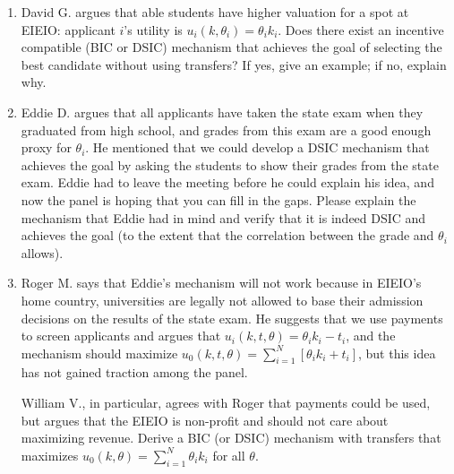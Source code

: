 \documentclass[a4paper]{article}
\newif\ifsolutions
\begin{document}
\begin{enumerate}
	\item David G. argues that able students have higher valuation for a spot at EIEIO: applicant $i$'s utility is $u_i(k,\theta_i) = \theta_i k_i$. Does there exist an incentive compatible (BIC or DSIC) mechanism that achieves the goal of selecting the best candidate without using transfers? If yes, give an example; if no, explain why.
	
	\item Eddie D. argues that all applicants have taken the state exam when they graduated from high school, and grades from this exam are a good enough proxy for $\theta_i$. He mentioned that we could develop a DSIC mechanism that achieves the goal by asking the students to show their grades from the state exam. Eddie had to leave the meeting before he could explain his idea, and now the panel is hoping that you can fill in the gaps. Please explain the mechanism that Eddie had in mind and verify that it is indeed DSIC and achieves the goal (to the extent that the correlation between the grade and $\theta_i$ allows).
	
	\item Roger M. says that Eddie's mechanism will not work because in EIEIO's home country, universities are legally not allowed to base their admission decisions on the results of the state exam. He suggests that we use payments to screen applicants and argues that $u_i(k,t,\theta) = \theta_i k_i - t_i$, and the mechanism should maximize $u_0(k,t,\theta) = \sum_{i=1}^N \left[ \theta_i k_i + t_i \right]$, but this idea has not gained traction among the panel. 
	
	William V., in particular, agrees with Roger that payments could be used, but argues that the EIEIO is non-profit and should not care about maximizing revenue. Derive a BIC (or DSIC) mechanism with transfers that maximizes $u_0(k,\theta) = \sum_{i=1}^N \theta_i k_i$ for all $\theta$.
\end{enumerate}


\ifsolutions
\end{document}
